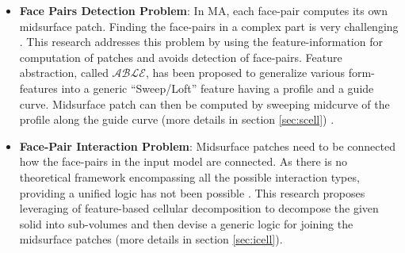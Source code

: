 \begin{itemize}[noitemsep,topsep=2pt,parsep=2pt,partopsep=2pt]%
	\item  \textbf{Face Pairs Detection Problem}:  \label{sec:facepairdetection}
In MA, each face-pair computes its own midsurface patch. Finding the face-pairs in a complex part is very challenging \cite{Boussuge2013}. This research addresses this problem by using the feature-information for computation of patches and avoids detection of face-pairs.  Feature abstraction, called $\mathcal{ABLE}$, has been proposed to generalize various form-features into a generic ``Sweep/Loft'' feature having a profile and a guide curve. Midsurface patch can then be computed by sweeping midcurve of the profile along the guide curve (more details in section \ref{sec:scell}) \cite{YogeshIITG2014}.

	\item  \textbf{Face-Pair Interaction Problem}: \label{sec:facepairinteraction}
Midsurface patches need to be connected  how the face-pairs in the input model are connected. As there is no theoretical framework encompassing all the possible interaction types, providing a unified logic has not been possible \cite{Stolt2006}.    This research proposes  leveraging of feature-based cellular decomposition to decompose the given solid into sub-volumes and then devise a generic logic for joining the midsurface patches (more details in section \ref{sec:icell}).
\end{itemize}
 
